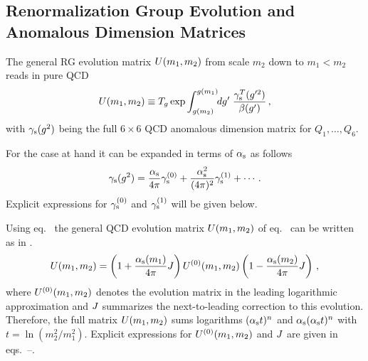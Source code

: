 \subsection{Renormalization Group Evolution and Anomalous Dimension Matrices}
            \label{sec:HeffdF1:66:rge}
The general RG evolution matrix $U(m_1,m_2)$ from scale $m_2$ down to
$m_1 < m_2$ reads in pure QCD
\begin{equation}
U(m_1,m_2) \equiv T_g \exp
\int_{g(m_2)}^{g(m_1)} \!\! dg' \; \frac{\gamma_{\rm s}^T(g'^2)}{\beta(g')} \, ,
\label{eq:UgeneralQCD}
\end{equation}
with $\gamma_{\rm s}(g^2)$ being the full $6\times 6$ QCD anomalous dimension
matrix for $Q_1, \ldots, Q_6$.

For the case at hand it can be expanded in terms of $\alpha_{\rm s}$ as follows
\begin{equation}
\gamma_{\rm s}(g^2) = \frac{\alpha_{\rm s}}{4\pi} \gamma_{\rm s}^{(0)} + \frac{\alpha_{\rm s}^2}{(4\pi)^2} \gamma_{\rm s}^{(1)}
                   + \cdots \, .
\label{eq:gsexpKpp}
\end{equation}
Explicit expressions for $\gamma_{\rm s}^{(0)}$ and $\gamma_{\rm s}^{(1)}$ will be given below.

Using eq.\  the general QCD evolution matrix
$U(m_1,m_2)$ of eq.~ can be written as in 
\cite{burasetal:92a}.
\begin{equation}
U(m_1,m_2) = 
\left( 1 + \frac{\alpha_{\rm s}(m_1)}{4\pi} J \right)
U^{(0)}(m_1,m_2)
\left( 1 - \frac{\alpha_{\rm s}(m_2)}{4\pi} J \right) \, ,
\label{eq:UQCDKpp}
\end{equation}
where $U^{(0)}(m_1,m_2)$ denotes the evolution matrix in the leading
logarithmic approximation and $J$ summarizes the next-to-leading
correction to this evolution. Therefore, the full matrix $U(m_1,m_2)$
sums logarithms $(\alpha_{\rm s} t)^n$ and $\alpha_{\rm s} (\alpha_{\rm s} t)^n$ with $t=\ln(m_2^2/m_1^2)$.
Explicit expressions for $U^{(0)}(m_1,m_2)$ and $J$ are given in
eqs.~--.

